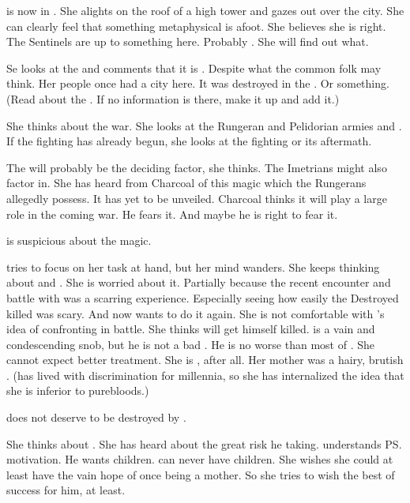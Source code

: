 
\Achsah is now in \Forklin. 
She alights on the roof of a high tower and gazes out over the city. 
She can clearly feel that something metaphysical is afoot. 
She believes she is right. 
The Sentinels are up to something here. 
Probably \Secherdamon. 
She will find out what. 

Se looks at the  and comments that it is . 
Despite what the common folk may think. 
Her people once had a city here.
It was destroyed in the \resphanwars. 
Or something. 
(Read about the . 
 If no information is there, make it up and add it.)

She thinks about the war.
She looks at the Rungeran and Pelidorian armies and \ishroth. 
If the fighting has already begun, she looks at the fighting or its aftermath.

The \ishroth will probably be the deciding factor, she thinks.
The Imetrians might also factor in. 
She has heard from Charcoal of this \quo{\EreshKali} magic which the Rungerans allegedly possess. 
It has yet to be unveiled. 
Charcoal thinks it will play a large role in the coming war. 
He fears it.
And maybe he is right to fear it.

\Achsah is suspicious about the \EreshKali magic. 

\Achsah tries to focus on her task at hand, but her mind wanders.
She keeps thinking about \Teshrial and \Ishnaruchaefir. 
She is worried about it. 
Partially because the recent encounter and battle with \Ishnaruchaefir was a scarring experience. 
Especially seeing how easily the Destroyed killed \Teshrial was scary.
And now \Teshrial wants to do it again.
She is not comfortable with \Teshrial's idea of confronting \Ishnaruchaefir in battle. 
She thinks \Teshrial will get himself killed. 
\Teshrial is a vain and condescending snob, but he is not a bad \resphan.
He is no worse than most of \CiriathSepher. 
She cannot expect better treatment. 
She is \ashenblooded, after all. 
Her mother was a hairy, brutish \nephil. 
(\Achsah has lived with discrimination for millennia, so she has internalized the idea that she is inferior to purebloods.)

\Teshrial does not deserve to be destroyed by \Ishnaruchaefir. 

She thinks about \Teshrial.
She has heard about the great risk he taking. 
\Achsah{} understands \ps{\Teshrial} motivation. 
He wants children. 
\Achsah{} can never have children. 
She wishes she could at least have the vain hope of once being a mother. 
So she tries to wish the best of success for him, at least. 

